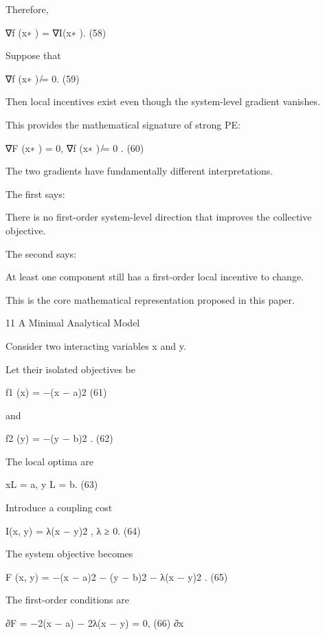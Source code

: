 \documentclass[10pt,a4paper]{article}
\begin{document}
\begin{ManuscriptText}
Therefore,


                                       ∇f (x∗ ) = ∇I(x∗ ).                                (58)

Suppose that


                                          ∇f (x∗ ) ̸= 0.                                  (59)

Then local incentives exist even though the system-level gradient vanishes.

This provides the mathematical signature of strong PE:


                                   ∇F (x∗ ) = 0,        ∇f (x∗ ) ̸= 0 .                        (60)

The two gradients have fundamentally different interpretations.

The first says:


      There is no first-order system-level direction that improves the collective objective.


The second says:


      At least one component still has a first-order local incentive to change.


This is the core mathematical representation proposed in this paper.


11     A Minimal Analytical Model

Consider two interacting variables x and y.

Let their isolated objectives be


                                         f1 (x) = −(x − a)2                                    (61)

and


                                         f2 (y) = −(y − b)2 .                                  (62)

The local optima are


                                        xL = a,         y L = b.                               (63)

Introduce a coupling cost


                                   I(x, y) = λ(x − y)2 ,        λ ≥ 0.                         (64)

The system objective becomes


                            F (x, y) = −(x − a)2 − (y − b)2 − λ(x − y)2 .                      (65)

The first-order conditions are

                                 ∂F
                                    = −2(x − a) − 2λ(x − y) = 0,                               (66)
                                 ∂x



\end{ManuscriptText}
\end{document}
